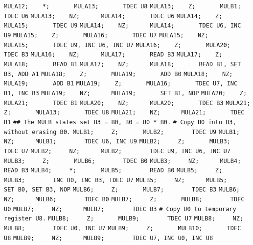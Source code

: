 \begin{apgsembly}
\begin{minipage}[t]{.49\textwidth}
\begin{algorithmic}
			\State \verb|MULA12;    *;       MULA13;       TDEC U8|
			\State \verb|MULA13;    Z;       MULB1;        TDEC U6|
			\State \verb|MULA13;    NZ;      MULA14;       TDEC U6|
			\State \verb|MULA14;    Z;       MULA15;       TDEC U9|
			\State \verb|MULA14;    NZ;      MULA14;       TDEC U6, INC U9|
			\State \verb|MULA15;    Z;       MULA16;       TDEC U7|
			\State \verb|MULA15;    NZ;      MULA15;       TDEC U9, INC U6, INC U7|
			\State \verb|MULA16;    Z;       MULA20;       TDEC B3|
			\State \verb|MULA16;    NZ;      MULA17;       READ B3|
			\State \verb|MULA17;    Z;       MULA18;       READ B1|
			\State \verb|MULA17;    NZ;      MULA18;       READ B1, SET B3, ADD A1|
			\State \verb|MULA18;    Z;       MULA19;       ADD B0|
			\State \verb|MULA18;    NZ;      MULA19;       ADD B1|
			\State \verb|MULA19;    Z;       MULA16;       TDEC U7, INC B1, INC B3|
			\State \verb|MULA19;    NZ;      MULA19;       SET B1, NOP|
			\State \verb|MULA20;    Z;       MULA21;       TDEC B1|
			\State \verb|MULA20;    NZ;      MULA20;       TDEC B3|
			\State \verb|MULA21;    Z;       MULA13;       TDEC U8|
			\State \verb|MULA21;    NZ;      MULA21;       TDEC B1|
			\State \verb||
			\State \verb|## The MULB states set B3 = B0, B0 = U0 * B0.|
			\State \verb|# Copy B0 into B3, without erasing B0.|
			\State \verb|MULB1;     Z;       MULB2;        TDEC U9|
			\State \verb|MULB1;     NZ;      MULB1;        TDEC U6, INC U9|
			\State \verb|MULB2;     Z;       MULB3;        TDEC U7|
			\State \verb|MULB2;     NZ;      MULB2;        TDEC U9, INC U6, INC U7|
			\State \verb|MULB3;     Z;       MULB6;        TDEC B0|
			\State \verb|MULB3;     NZ;      MULB4;        READ B3|
			\State \verb|MULB4;     *;       MULB5;        READ B0|
			\State \verb|MULB5;     Z;       MULB3;        INC B0, INC B3, TDEC U7|
			\State \verb|MULB5;     NZ;      MULB5;        SET B0, SET B3, NOP|
			\State \verb|MULB6;     Z;       MULB7;        TDEC B3|
			\State \verb|MULB6;     NZ;      MULB6;        TDEC B0|
			\State \verb|MULB7;     Z;       MULB8;        TDEC U0|
			\State \verb|MULB7;     NZ;      MULB7;        TDEC B3|
			\State \verb||
			\State \verb|# Copy U0 to temporary register U8.|
			\State \verb|MULB8;     Z;       MULB9;        TDEC U7|
			\State \verb|MULB8;     NZ;      MULB8;        TDEC U0, INC U7|
			\State \verb|MULB9;     Z;       MULB10;       TDEC U8|
			\State \verb|MULB9;     NZ;      MULB9;        TDEC U7, INC U0, INC U8|
		\end{algorithmic}
	\end{minipage}\hfill{\color{gray}\vline}\hfill

\end{apgsembly}
